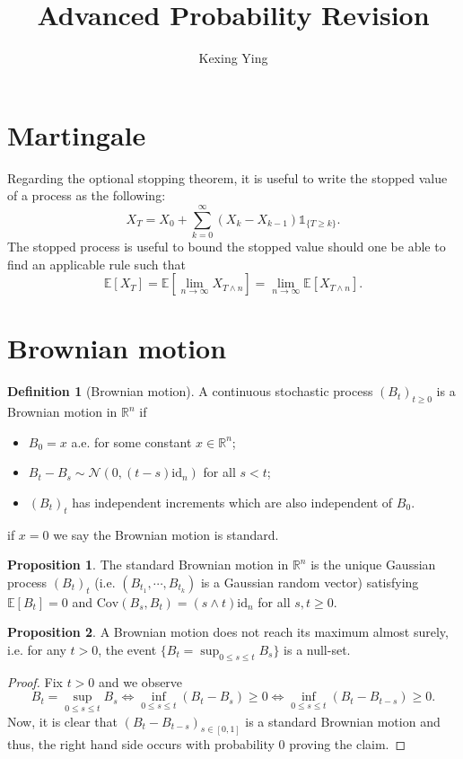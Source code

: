 \documentclass[]{article}
\title{Advanced Probability Revision}
\author{Kexing Ying}
\theoremstyle{definition}
\newtheorem*{definition}{Definition}
\newtheorem*{proposition}{Proposition}
\begin{document}
\maketitle

\section*{Martingale}

Regarding the optional stopping theorem, it is useful to write the stopped value of a process as 
the following: 
\[X_T = X_0 + \sum_{k = 0}^\infty (X_k - X_{k - 1})\mathbb{1}_{\{T \ge k\}}.\]
The stopped process is useful to bound the stopped value should one be able to find an applicable 
rule such that 
\[\mathbb{E}[X_T] = \mathbb{E}\left[\lim_{n \to \infty} X_{T \wedge n}\right] 
  = \lim_{n \to \infty} \mathbb{E}[X_{T \wedge n}].\]


\section*{Brownian motion}

\begin{definition}[Brownian motion]
  A continuous stochastic process \((B_t)_{t \ge 0}\) is a Brownian motion in \(\mathbb{R}^n\) if 
  \begin{itemize}
    \item \(B_0 = x\) a.e. for some constant \(x \in \mathbb{R}^n\);
    \item \(B_t - B_s \sim \mathcal{N}(0, (t - s)\text{id}_n)\) for all \(s < t\);
    \item \((B_t)_t\) has independent increments which are also independent of \(B_0\).
  \end{itemize}
  if \(x = 0\) we say the Brownian motion is standard.
\end{definition}

\begin{proposition}
  The standard Brownian motion in \(\mathbb{R}^n\) is the unique Gaussian process \((B_t)_t\)
  (i.e. \((B_{t_1}, \cdots, B_{t_k})\) is a Gaussian random vector) satisfying 
  \(\mathbb{E}[B_t] = 0\) and \(\text{Cov}(B_s, B_t) = (s \wedge t) \text{id}_n\) for all \(s, t \ge 0\).
\end{proposition}

\begin{proposition}
  A Brownian motion does not reach its maximum almost surely, i.e. for any \(t > 0\), the event 
  \(\{B_t = \sup_{0 \le s \le t} B_s\}\) is a null-set.
\end{proposition}
\begin{proof}
  Fix \(t > 0\) and we observe 
  \[B_t = \sup_{0 \le s \le t} B_s \iff 
    \inf_{0 \le s \le t} (B_t - B_s) \ge 0 \iff 
    \inf_{0 \le s \le t} (B_t - B_{t - s}) \ge 0.\]
  Now, it is clear that \((B_t - B_{t - s})_{s \in [0, 1]}\) is a standard Brownian motion and thus, 
  the right hand side occurs with probability 0 proving the claim.
\end{proof}
\end{document}
